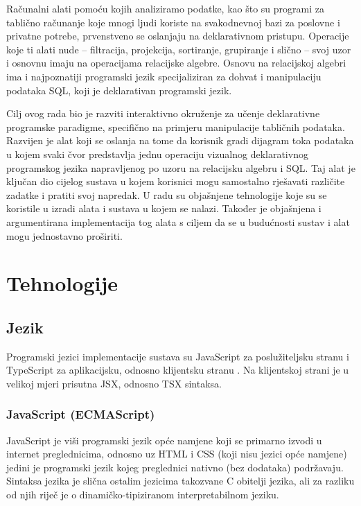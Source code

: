 \documentclass[times, utf8, diplomski, numeric]{fer}
\newcommand{\razmaks}{\vspace{10pt}}
\begin{document}
Računalni alati pomoću kojih analiziramo podatke, kao što su programi za tablično računanje koje mnogi ljudi koriste na svakodnevnoj bazi za poslovne i privatne potrebe, prvenstveno se oslanjaju na deklarativnom pristupu. 
Operacije koje ti alati nude -- filtracija, projekcija, sortiranje, grupiranje i slično -- svoj uzor i osnovnu imaju na operacijama relacijske algebre.
Osnovu na relacijskoj algebri ima i najpoznatiji programski jezik specijaliziran za dohvat i manipulaciju podataka SQL, koji je deklarativan programski jezik.

\newpage

Cilj ovog rada bio je razviti interaktivno okruženje za učenje deklarativne programske paradigme, specifično na primjeru manipulacije tabličnih podataka.
Razvijen je alat koji se oslanja na tome da korisnik gradi dijagram toka podataka u kojem svaki čvor predstavlja jednu operaciju vizualnog deklarativnog programskog jezika napravljenog po uzoru na relacijsku algebru i SQL.
Taj alat je ključan dio cijelog sustava u kojem korisnici mogu samostalno rješavati različite zadatke i pratiti svoj napredak.
U radu su objašnjene tehnologije koje su se koristile u izradi alata i sustava u kojem se nalazi.
Također je objašnjena i argumentirana implementacija tog alata s ciljem da se u budućnosti sustav i alat mogu jednostavno proširiti.



\chapter{Tehnologije}


\section{Jezik}

Programski jezici implementacije sustava su JavaScript za poslužiteljsku stranu  i TypeScript za aplikacijsku, odnosno klijentsku stranu .
Na klijentskoj strani je u velikoj mjeri prisutna JSX, odnosno TSX sintaksa.


\razmaks
\subsection{JavaScript (ECMAScript)}

JavaScript je viši programski jezik opće namjene koji se primarno izvodi u internet preglednicima, odnosno uz HTML i CSS (koji nisu jezici opće namjene) jedini je programski jezik kojeg preglednici nativno (bez dodataka) podržavaju.
Sintaksa jezika je slična ostalim jezicima takozvane C obitelji jezika, ali za razliku od njih riječ je o dinamičko-tipiziranom  interpretabilnom jeziku.\citep{mdn_js}
\end{document}
